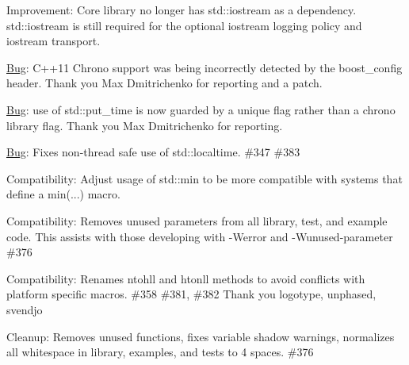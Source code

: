 \begin{DoxyItemize}
\item Improvement\+: Core library no longer has std\+::iostream as a dependency. std\+::iostream is still required for the optional iostream logging policy and iostream transport.
\item \mbox{\hyperlink{struct_bug}{Bug}}\+: C++11 Chrono support was being incorrectly detected by the {\ttfamily boost\+\_\+config} header. Thank you Max Dmitrichenko for reporting and a patch.
\item \mbox{\hyperlink{struct_bug}{Bug}}\+: use of {\ttfamily std\+::put\+\_\+time} is now guarded by a unique flag rather than a chrono library flag. Thank you Max Dmitrichenko for reporting.
\item \mbox{\hyperlink{struct_bug}{Bug}}\+: Fixes non-\/thread safe use of std\+::localtime. \#347 \#383
\item Compatibility\+: Adjust usage of std\+::min to be more compatible with systems that define a min(...) macro.
\item Compatibility\+: Removes unused parameters from all library, test, and example code. This assists with those developing with -\/\+Werror and -\/\+Wunused-\/parameter \#376
\item Compatibility\+: Renames ntohll and htonll methods to avoid conflicts with platform specific macros. \#358 \#381, \#382 Thank you logotype, unphased, svendjo
\item Cleanup\+: Removes unused functions, fixes variable shadow warnings, normalizes all whitespace in library, examples, and tests to 4 spaces. \#376
\end{DoxyItemize}

